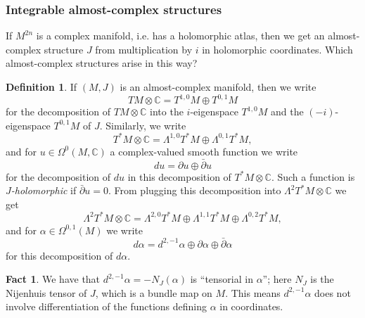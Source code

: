 \documentclass[a4paper]{article}
\theoremstyle{definition}
\newtheorem*{definition}{Definition}
\newtheorem*{fact}{Fact}
\theoremstyle{remark}
\newcommand{\C}{\mathbb{C}}
\begin{document}
\subsubsection*{Integrable almost-complex structures}

If $M^{2n}$ is a complex manifold, i.e. has a holomorphic atlas, then we get an
almost-complex structure $J$ from multiplication by $i$ in holomorphic
coordinates. Which almost-complex structures arise in this way?

\begin{definition}
    If $(M,J)$ is an almost-complex manifold, then we write
    \begin{equation*}
        TM\otimes\C = T^{1,0}M\oplus T^{0,1}M
    \end{equation*}
    for the decomposition of $TM\otimes\C$ into the $i$-eigenspace $T^{1,0}M$
    and the $(-i)$-eigenspace $T^{0,1}M$ of $J$. Similarly, we write
    \begin{equation*}
        T^*M\otimes\C = \Lambda^{1,0}T^*M\oplus\Lambda^{0,1}T^*M,
    \end{equation*}
    and for $u\in\Omega^0(M,\C)$ a complex-valued smooth function we write
    \begin{equation*}
        du = \partial u\oplus\bar\partial u
    \end{equation*}
    for the decomposition of $du$ in this decomposition of $T^*M\otimes\C$. Such
    a function is \emph{$J$-holomorphic} if $\bar\partial u=0$. From plugging
    this decomposition into $\Lambda^2T^*M\otimes\C$ we get
    \begin{equation*}
        \Lambda^2T^*M\otimes\C
            = \Lambda^{2,0}T^*M\oplus\Lambda^{1,1}T^*M\oplus\Lambda^{0,2}T^*M,
    \end{equation*}
    and for $\alpha\in\Omega^{0,1}(M)$ we write
    \begin{equation*}
        d\alpha = d^{2,-1}\alpha\oplus\partial\alpha\oplus\bar\partial\alpha
    \end{equation*}
    for this decomposition of $d\alpha$.
\end{definition}

\begin{fact}
    We have that $d^{2,-1}\alpha=-N_J(\alpha)$ is ``tensorial in $\alpha$'';
    here $N_J$ is the Nijenhuis tensor of $J$, which is a bundle map on $M$.
    This means $d^{2,-1}\alpha$ does not involve differentiation of the
    functions defining $\alpha$ in coordinates.
\end{fact}
\end{document}
